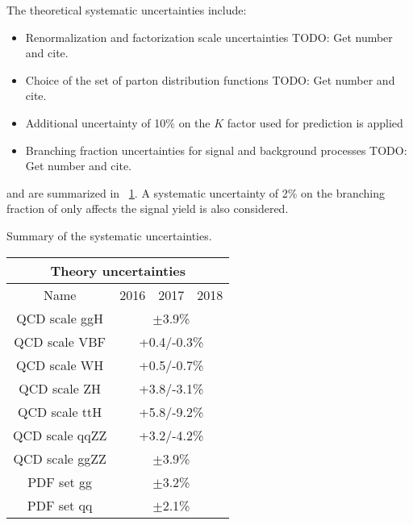 The theoretical systematic uncertainties include:
\begin{itemize}
	\item Renormalization and factorization scale uncertainties  TODO: Get number and cite.
	\item Choice of the set of parton distribution functions TODO: Get number and cite.
	\item Additional uncertainty of 10\% on the $K$ factor used for \ggzzfourl prediction is applied
	\item Branching fraction uncertainties for signal and background processes TODO: Get number and cite.
\end{itemize}
and are summarized in \tablename~\ref{table:theo_syst}.
A systematic uncertainty of 2\% on the branching fraction of \hzzfourl only affects the signal yield is also considered. 
\begin{table}[ht]	
	\begin{center}
		\topcaption
		{Summary of the systematic uncertainties.}
		\begin{tabular}{cccc}
		\hline
		\multicolumn{4}{c}{Theory uncertainties} \\
		\hline
		Name & 2016 & 2017 & 2018 \\
		\hline
		\hline
		QCD scale ggH	& \multicolumn{3}{c}{$\pm$3.9\%} \\
		QCD scale VBF	& \multicolumn{3}{c}{+0.4/-0.3\%} \\
		QCD scale WH	& \multicolumn{3}{c}{+0.5/-0.7\%} \\
		QCD scale ZH	& \multicolumn{3}{c}{+3.8/-3.1\%} \\
		QCD scale ttH	& \multicolumn{3}{c}{+5.8/-9.2\%} \\
		\hline
		\hline
		QCD scale qqZZ	& \multicolumn{3}{c}{+3.2/-4.2\%} \\
		QCD scale ggZZ	& \multicolumn{3}{c}{$\pm$3.9\%} \\
		\hline
		\hline
		PDF set gg	& \multicolumn{3}{c}{$\pm$3.2\%} \\
		PDF set qq	& \multicolumn{3}{c}{$\pm$2.1\%} \\
		\hline
		\end{tabular}
		\label{table:theo_syst}
	\end{center}
\end{table}
